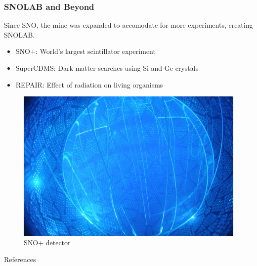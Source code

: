 \documentclass[10pt]{beamer}
\begin{document}
	\begin{frame}
		\frametitle{SNOLAB and Beyond}
		Since SNO, the mine was expanded to accomodate for more experiments, creating SNOLAB.
		\begin{itemize}
			\item SNO+: World's largest scintillator experiment
			\item SuperCDMS: Dark matter searches using Si and Ge crystals
			\item REPAIR: Effect of radiation on living organisms
		\end{itemize}

		\begin{center}
			\begin{figure}
				\includegraphics[scale=0.1]{sno+.jpeg}
				\caption{SNO+ detector}
			\end{figure}
		\end{center}
	\end{frame}
	\begin{frame}{References}
		\fontsize{10pt}{12pt}\selectfont
		\nocite{*}
		 
		
	\end{frame}
\end{document}
